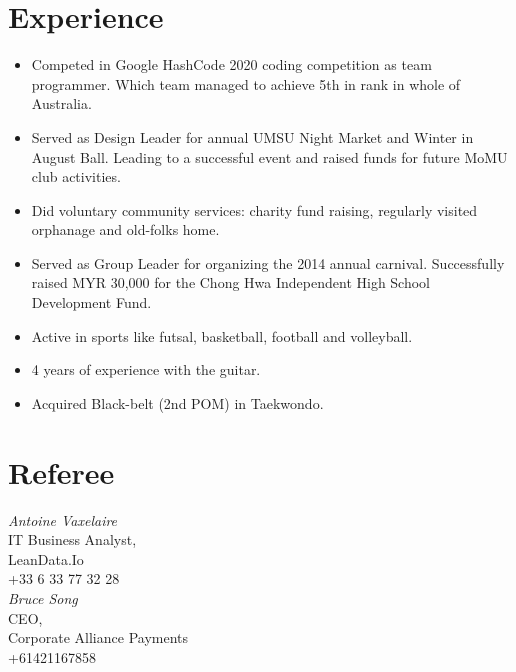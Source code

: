 \documentclass[10pt, a4paper]{cv}
\begin{document}
\begin{paracol}{2}
\begin{flushleft}
		\switchcolumn

		\section*{Experience}
		\begin{itemize} \itemsep -2pt
			\item Competed in Google HashCode 2020 coding competition as team programmer. Which team managed to achieve 5th in rank in whole of Australia.
			\item Served as Design Leader for annual UMSU Night Market and Winter in August Ball. Leading to a successful event and raised funds for future MoMU club activities.
			\item Did voluntary community services: charity fund raising, regularly visited orphanage and old-folks home.
			\item Served as Group Leader for organizing the 2014 annual carnival. Successfully raised MYR 30,000 for the Chong Hwa Independent High School Development Fund.
			\item Active in sports like futsal, basketball, football and volleyball.
			\item 4 years of experience with the guitar.
			\item Acquired Black-belt (2nd POM) in Taekwondo.
		\end{itemize}

		\switchcolumn

		\section*{Referee}
		 {\sl Antoine Vaxelaire} \\
		IT Business Analyst, \\
		LeanData.Io  \\
		+33 6 33 77 32 28 \\
		\bigskip
		{\sl Bruce Song} \\
		CEO, \\
		Corporate Alliance Payments  \\
		+61421167858 \\
	\end{flushleft}
\end{paracol}
\end{document}
